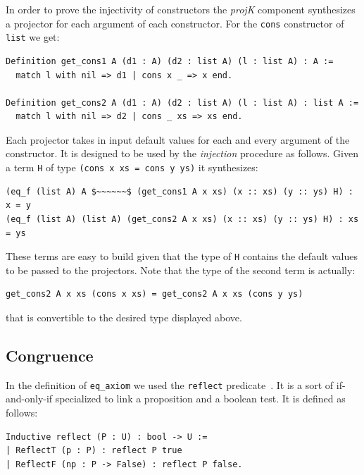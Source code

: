 \documentclass[a4paper,UKenglish,cleveref, autoref]{lipics-v2019}
\newcommand{\derive}[1]{\emph{#1}}
\begin{document}
In order to prove the injectivity of constructors the \derive{projK}
component synthesizes a projector for each argument of each constructor.
For the \lstinline+cons+ constructor of \lstinline+list+ we get:

\begin{lstlisting}
Definition get_cons1 A (d1 : A) (d2 : list A) (l : list A) : A :=
  match l with nil => d1 | cons x _ => x end.

Definition get_cons2 A (d1 : A) (d2 : list A) (l : list A) : list A :=
  match l with nil => d2 | cons _ xs => xs end.
\end{lstlisting}

\noindent
Each projector takes in input default values for each and every
argument of the constructor. It is designed to be used by the
\derive{injection} procedure as follows. Given a term
\lstinline+H+ of type \lstinline+(cons x xs = cons y ys)+
it synthesizes:

\begin{lstlisting}
(eq_f (list A) A $~~~~~~$ (get_cons1 A x xs) (x :: xs) (y :: ys) H) : x = y
(eq_f (list A) (list A) (get_cons2 A x xs) (x :: xs) (y :: ys) H) : xs = ys
\end{lstlisting}

\noindent
These terms are easy to build given that the type of \lstinline+H+
contains the default values to be passed to the projectors.
Note that the type of the second term is actually:

\begin{lstlisting}
get_cons2 A x xs (cons x xs) = get_cons2 A x xs (cons y ys)
\end{lstlisting}

\noindent
that is convertible to the desired type displayed above.

\subsection{Congruence} %
\label{sec:reflect}

In the definition of \lstinline+eq_axiom+ we used the \lstinline+reflect+
predicate~\cite{mcb}. It is a sort of if-and-only-if specialized to link a
proposition and a boolean test. It is defined as follows:

\begin{lstlisting}
Inductive reflect (P : U) : bool -> U :=
| ReflectT (p : P) : reflect P true
| ReflectF (np : P -> False) : reflect P false.
\end{lstlisting}
\end{document}
